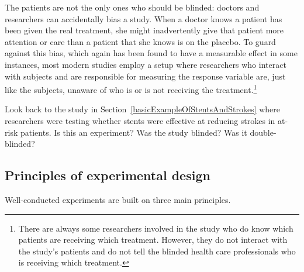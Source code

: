 The patients are not the only ones who should be blinded: doctors and researchers can accidentally bias a study. When a doctor knows a patient has been given the real treatment, she might inadvertently give that patient more attention or care than a patient that she knows is on the placebo. To guard against this bias, which again has been found to have a measurable effect in some instances, most modern studies employ a  setup where researchers who interact with subjects and are responsible for measuring the response variable are, just like the subjects, unaware of who is or is not receiving the treatment.\footnote{There are always some researchers involved in the study who do know which patients are receiving which treatment. However, they do not interact with the study's patients and do not tell the blinded health care professionals who is receiving which treatment.}


\begin{exercisewrap}
\begin{nexercise}
Look back to the study in Section~\ref{basicExampleOfStentsAndStrokes} where researchers were testing whether stents were effective at reducing strokes in at-risk patients. Is this an experiment? Was the study blinded? Was it double-blinded?\footnotemark
\end{nexercise}
\end{exercisewrap}

\subsection{Principles of experimental design}
\label{experimentalDesignPrinciples}

Well-conducted experiments are built on three main principles.

